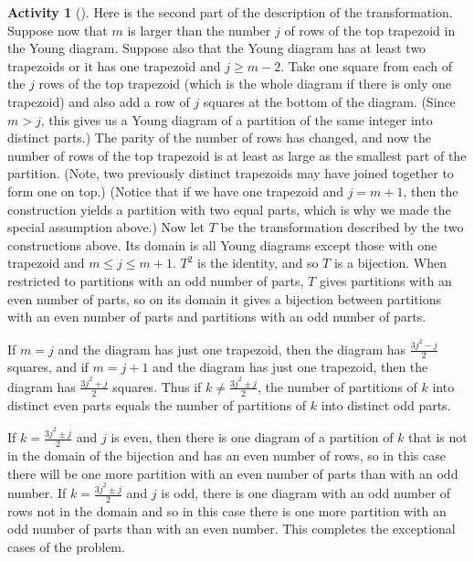 \documentclass[10pt,]{book}
\theoremstyle{plain}
\theoremstyle{definition}
\newtheorem{activity}[project]{Activity}
\numberwithin{equation}{chapter}
\begin{document}
\begin{activity}[]
Here is the second part of the description of the transformation. Suppose now that \(m\) is larger than the number \(j\) of rows of the top trapezoid in the Young diagram. Suppose also that the Young diagram has at least two trapezoids or it has one trapezoid and \(j\ge m-2\). Take one square from each of the \(j\) rows of the top trapezoid (which is the whole diagram if there is only one trapezoid) and also add a row of \(j\) squares at the bottom of the diagram. (Since \(m>j\), this gives us a Young diagram of a partition of the same integer into distinct parts.) The parity of the number of rows has changed, and now the number of rows of the top trapezoid is at least as large as the smallest part of the partition. (Note, two previously distinct trapezoids may have joined together to form one on top.)  (Notice that if we have one trapezoid and \(j= m+1\), then the construction yields a partition with two equal parts, which is why we made the special assumption above.) Now let \(T\) be the transformation described by the two constructions above. Its domain is all Young diagrams except those with one trapezoid and \(m\le j\le m+1\). \(T^2\) is the identity, and so \(T\) is a bijection.  When restricted to partitions with an odd number of parts, \(T\) gives partitions with an even number of parts, so on its domain it gives a bijection between partitions with an even number of parts and partitions with an odd number of parts.%
\par
If \(m=j\) and the diagram has just one trapezoid, then the diagram has \(\frac{3j^2-j}{2}\) squares, and if \(m=j+1\) and the diagram has just one trapezoid, then the diagram has \(\frac{3j^2+j}{2}\) squares. Thus if \(k\ne \frac{3j^2\pm j}{2}\), the number of partitions of \(k\) into distinct even parts equals the number of partitions of \(k\) into distinct odd parts.%
\par
If \(k= \frac{3j^2\pm j}{2}\) and \(j\) is even, then there is one diagram of a partition of \(k\) that is not in the domain of the bijection and has an even number of rows, so in this case there will be one more partition with an even number of parts than with an odd number. If \(k= \frac{3j^2\pm j}{2}\) and \(j\) is odd, there is one diagram with an odd number of rows not in the domain and so in this case there is one more partition with an odd number of parts than with an even number. This completes the exceptional cases of the problem.%
\end{activity}
\typeout{************************************************}
\typeout{************************************************}
\end{document}
